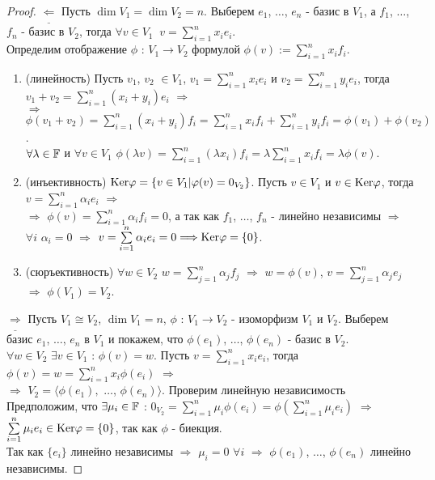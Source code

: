   \begin{proof}
    $\underline{\Longleftarrow}$ Пусть $\dim V_1=\dim V_2=n$. Выберем $e_1$, $\ldots$, $e_n$ - базис в $V_1$, а $f_1$, $\ldots$, $f_n$ - базис в $V_2$, тогда $\forall v \in V_1 \ $ $v=\sum\limits_{i=1}^nx_ie_i$.\\ Определим отображение $\phi$ : $V_1 \to V_2$ формулой $\phi(v):=\sum\limits_{i=1}^nx_if_i$.
    \begin{enumerate}
      \item (линейность) Пусть $v_1$, $v_2$ $\in V_1$, $v_1=\sum\limits_{i=1}^nx_ie_i$ и $v_2=\sum\limits_{i=1}^ny_ie_i$, тогда\\ $v_1+v_2=\sum\limits_{i=1}^n(x_i+y_i)e_i$ $\Longrightarrow$\\ $\Longrightarrow$ $\phi(v_1+v_2) = \sum\limits_{i=1}^n(x_i+y_i)f_i=\sum\limits_{i=1}^nx_if_i+\sum\limits_{i=1}^ny_if_i=\phi(v_1)+\phi(v_2)$.\\ $\forall\lambda\in\F$ и $\forall v\in V_1$ $\phi(\lambda v)=\sum\limits_{i=1}^n(\lambda x_i)f_i =\lambda\sum\limits_{i=1}^nx_if_i=\lambda\phi(v)$.
      \item (инъективность) $\textup{Ker}\phi = \{v\in V_1 | \phi(v)=0_{V_2}\}$. Пусть $v\in V_1$ и $v\in \textup{Ker}\phi$, тогда $v=\sum\limits_{i=1}^n\alpha_ie_i$ $\Longrightarrow$\\$\Longrightarrow$ $\phi(v)=\sum\limits_{i=1}^n\alpha_if_i=0$, а так как $f_1$, $\ldots$, $f_n$ - линейно независимы $\Longrightarrow$ $\forall i$ $\alpha_i=0$ $\Longrightarrow$ $v=\sum\limits_{i=1}^n\alpha_ie_i=0 \Longrightarrow \textup{Ker}\phi=\{0\}$.
      \item (сюръективность) $\forall w\in V_2$ $w=\sum\limits_{j=1}^n\alpha_jf_j$ $\Longrightarrow$ $w=\phi(v)$, $v=\sum\limits_{j=1}^n\alpha_je_j$ $\Longrightarrow$ $\phi(V_1)=V_2$.
    \end{enumerate}
    $\underline{\Longrightarrow}$ Пусть $V_1\cong V_2$, $\dim V_1=n$, $\phi$ : $V_1 \to V_2$ - изоморфизм $V_1$ и $V_2$. Выберем базис $e_1$, $\ldots$, $e_n$ в $V_1$ и покажем, что $\phi(e_1)$, $\ldots$, $\phi(e_n)$ - базис в $V_2$.\\
    $\forall w\in V_2$ $\exists v\in V_1$ : $\phi(v)=w$. Пусть $v=\sum\limits_{i=1}^nx_ie_i$, тогда $\phi(v)=w=\sum\limits_{i=1}^nx_i\phi(e_i)$ $\Longrightarrow$\\ $\Longrightarrow$ $V_2=\langle\phi(e_1),$ $\ldots$, $\phi(e_n)\rangle$. Проверим линейную независимость\\
    Предположим, что $\exists\mu_i\in\F$ : $0_{V_2}=\sum\limits_{i=1}^n\mu_i\phi(e_i)=\phi(\sum\limits_{i=1}^n\mu_ie_i)$ $\Longrightarrow$ $\sum\limits_{i=1}^n\mu_ie_i\in \textup{Ker}\phi=\{0\}$, так как $\phi$ - биекция.\\ Так как $\{e_i\}$ линейно независимы $\Longrightarrow$ $\mu_i=0$ $\forall i$ $\Longrightarrow$ $\phi(e_1)$, $\ldots$, $\phi(e_n)$ линейно независимы.
  \end{proof}

